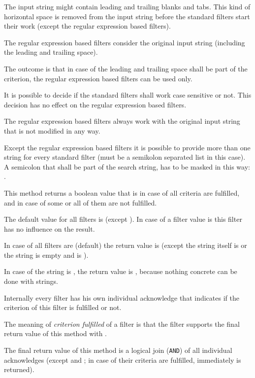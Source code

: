 The input string might contain leading and trailing blanks and tabs. This kind of horizontal space is removed from the input string
before the standard filters start their work (except the regular expression based filters).

The regular expression based filters consider the original input string (including the leading and trailing space).

The outcome is that in case of the leading and trailing space shall be part of the criterion, the regular expression based filters can be used only.

It is possible to decide if the standard filters shall work case sensitive or not. This decision has no effect on the regular expression based filters.

The regular expression based filters always work with the original input string that is not modified in any way.

Except the regular expression based filters it is possible to provide more than one string for every standard filter (must be a semikolon separated list in this case).
A semicolon that shall be part of the search string, has to be masked in this way: .

This method returns a boolean value that is  in case of all criteria are fulfilled, and  in case of some or all of them are not fulfilled.

The default value for all filters is  (except ). In case of a filter value is  this filter
has no influence on the result.

In case of all filters are  (default) the return value is  (except the string itself is 
or the string is empty and  is ).

In case of the string is , the return value is , because nothing concrete can be done with  strings.

Internally every filter has his own individual acknowledge that indicates if the criterion of this filter is fulfilled or not.

The meaning of \textit{criterion fulfilled} of a filter is that the filter supports the final return value  of this method with .

The final return value  of this method is a logical join (\texttt{AND}) of all individual acknowledges (except 
and ; in case of their criteria are fulfilled, immediately  is returned).

